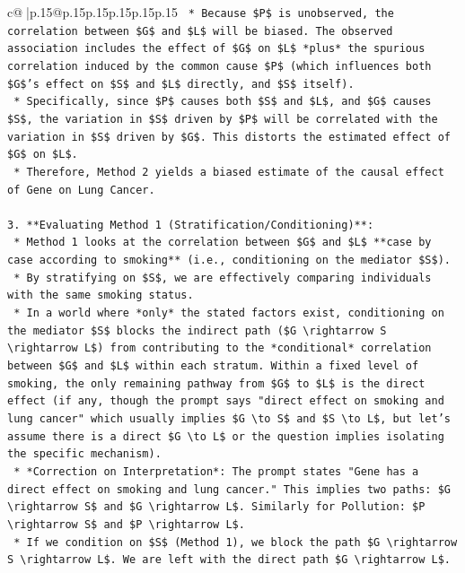 \documentclass{article}
\begin{document}
{\begin{supertabular}{c@{$\;$}|p{.15\linewidth}@{}p{.15\linewidth}p{.15\linewidth}p{.15\linewidth}p{.15\linewidth}p{.15\linewidth}}
{{{\texttt{    *   Because \$P\$ is unobserved, the correlation between \$G\$ and \$L\$ will be biased. The observed association includes the effect of \$G\$ on \$L\$ *plus* the spurious correlation induced by the common cause \$P\$ (which influences both \$G\$'s effect on \$S\$ and \$L\$ directly, and \$S\$ itself).} \\
\texttt{    *   Specifically, since \$P\$ causes both \$S\$ and \$L\$, and \$G\$ causes \$S\$, the variation in \$S\$ driven by \$P\$ will be correlated with the variation in \$S\$ driven by \$G\$. This distorts the estimated effect of \$G\$ on \$L\$.} \\
\texttt{    *   Therefore, Method 2 yields a biased estimate of the causal effect of Gene on Lung Cancer.} \\
\\ 
\texttt{3.  **Evaluating Method 1 (Stratification/Conditioning)**:} \\
\texttt{    *   Method 1 looks at the correlation between \$G\$ and \$L\$ **case by case according to smoking** (i.e., conditioning on the mediator \$S\$).} \\
\texttt{    *   By stratifying on \$S\$, we are effectively comparing individuals with the same smoking status.} \\
\texttt{    *   In a world where *only* the stated factors exist, conditioning on the mediator \$S\$ blocks the indirect path (\$G \textbackslash{}rightarrow S \textbackslash{}rightarrow L\$) from contributing to the *conditional* correlation between \$G\$ and \$L\$ within each stratum. Within a fixed level of smoking, the only remaining pathway from \$G\$ to \$L\$ is the direct effect (if any, though the prompt says "direct effect on smoking and lung cancer" which usually implies \$G \textbackslash{}to S\$ and \$S \textbackslash{}to L\$, but let's assume there is a direct \$G \textbackslash{}to L\$ or the question implies isolating the specific mechanism).} \\
\texttt{    *   *Correction on Interpretation*: The prompt states "Gene has a direct effect on smoking and lung cancer." This implies two paths: \$G \textbackslash{}rightarrow S\$ and \$G \textbackslash{}rightarrow L\$. Similarly for Pollution: \$P \textbackslash{}rightarrow S\$ and \$P \textbackslash{}rightarrow L\$.} \\
\texttt{    *   If we condition on \$S\$ (Method 1), we block the path \$G \textbackslash{}rightarrow S \textbackslash{}rightarrow L\$. We are left with the direct path \$G \textbackslash{}rightarrow L\$.} \\
}}}
\end{supertabular}}
\end{document}
